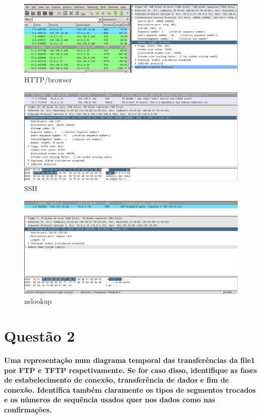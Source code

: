 \documentclass[a4paper]{report}
\begin{document}
\begin{figure}[H]
    \centering 
    \includegraphics[width=\textwidth]{images/http_browser.png}  
    \caption{HTTP/browser}
    \label{fig:http_browser}
\end{figure}

\begin{figure}[H]
    \centering 
    \includegraphics[width=\textwidth]{images/ssh.png}  
    \caption{SSH}
    \label{fig:ssh}
\end{figure}

\begin{figure}[H]
    \centering 
    \includegraphics[width=\textwidth]{images/nslookup.png}  
    \caption{nslookup}
    \label{fig:NSLOOKUP}
\end{figure}

\chapter{Questão 2}
\textbf{Uma representação num diagrama temporal das transferências da file1 por
FTP e TFTP respetivamente. Se for caso disso, identifique as fases de
estabelecimento de conexão, transferência de dados e fim de conexão. Identifica
também claramente os tipos de segmentos trocados e os números de sequência
usados quer nos dados como nas confirmações.}
\end{document}
